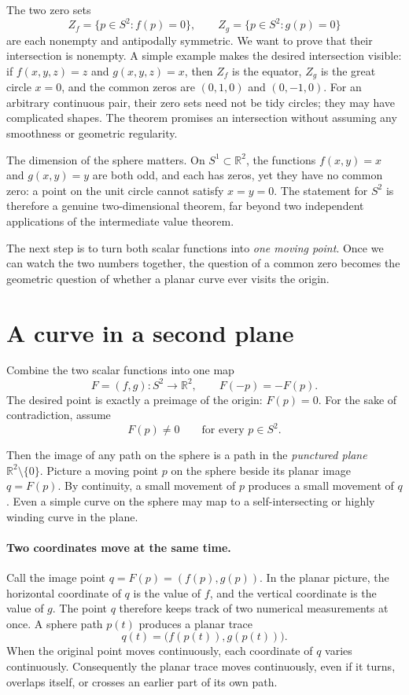The two zero sets
\[
 Z_f=\{p\in S^2:f(p)=0\},\qquad
 Z_g=\{p\in S^2:g(p)=0\}
\]
are each nonempty and antipodally symmetric. We want to prove that their intersection is nonempty. A simple example makes the desired intersection visible: if \(f(x,y,z)=z\) and \(g(x,y,z)=x\), then \(Z_f\) is the equator, \(Z_g\) is the great circle \(x=0\), and the common zeros are \((0,1,0)\) and \((0,-1,0)\). For an arbitrary continuous pair, their zero sets need not be tidy circles; they may have complicated shapes. The theorem promises an intersection without assuming any smoothness or geometric regularity.

The dimension of the sphere matters. On \(S^1\subset\mathbb R^2\), the functions \(f(x,y)=x\) and \(g(x,y)=y\) are both odd, and each has zeros, yet they have no common zero: a point on the unit circle cannot satisfy \(x=y=0\). The statement for \(S^2\) is therefore a genuine two-dimensional theorem, far beyond two independent applications of the intermediate value theorem.

The next step is to turn both scalar functions into \emph{one moving point}. Once we can watch the two numbers together, the question of a common zero becomes the geometric question of whether a planar curve ever visits the origin.

\section{A curve in a second plane}

Combine the two scalar functions into one map
\begin{equation}
 F=(f,g):S^2\longrightarrow\mathbb R^2,
 \qquad F(-p)=-F(p).
 \label{eq:N20261110-vector-map}
\end{equation}
The desired point is exactly a preimage of the origin: $F(p)=0$. For the sake of contradiction, assume
\begin{equation}
 F(p)\neq 0\qquad\text{for every }p\in S^2.
 \label{eq:N20261110-nozero}
\end{equation}

Then the image of any path on the sphere is a path in the \emph{punctured plane} $\mathbb R^2\setminus\{0\}$. Picture a moving point $p$ on the sphere beside its planar image $q=F(p)$. By continuity, a small movement of $p$ produces a small movement of $q$. Even a simple curve on the sphere may map to a self-intersecting or highly winding curve in the plane.

\paragraph{Two coordinates move at the same time.}
Call the image point \(q=F(p)=(f(p),g(p))\). In the planar picture, the horizontal coordinate of \(q\) is the value of \(f\), and the vertical coordinate is the value of \(g\). The point \(q\) therefore keeps track of two numerical measurements at once. A sphere path \(p(t)\) produces a planar trace
\[
 q(t)=\bigl(f(p(t)),g(p(t))\bigr).
\]
When the original point moves continuously, each coordinate of \(q\) varies continuously. Consequently the planar trace moves continuously, even if it turns, overlaps itself, or crosses an earlier part of its own path.

